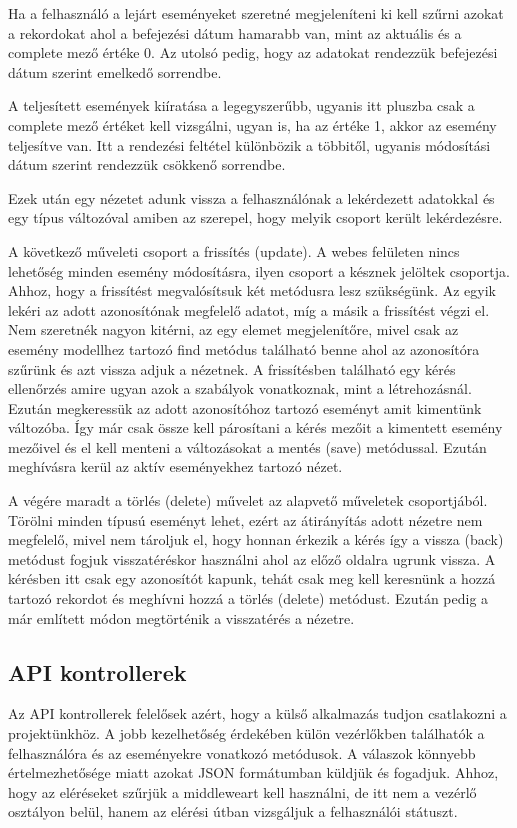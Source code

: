 \documentclass[
]{thesis-ekf}
\theoremstyle{definition}
\theoremstyle{remark}
\begin{document}
	Ha a felhasználó a lejárt eseményeket szeretné megjeleníteni ki kell szűrni azokat a rekordokat ahol a befejezési dátum hamarabb van, mint az aktuális és a complete mező értéke 0. Az utolsó pedig, hogy az adatokat rendezzük befejezési dátum szerint emelkedő sorrendbe.
	
	A teljesített események kiíratása a legegyszerűbb, ugyanis itt pluszba csak a complete mező értéket kell vizsgálni, ugyan is, ha az értéke 1, akkor az esemény teljesítve van. Itt a rendezési feltétel különbözik a többitől, ugyanis módosítási dátum szerint rendezzük csökkenő sorrendbe.
	
	Ezek után egy nézetet adunk vissza a felhasználónak a lekérdezett adatokkal és egy típus változóval amiben az szerepel, hogy melyik csoport került lekérdezésre.
	
	A következő műveleti csoport a frissítés (update). A webes felületen nincs lehetőség minden esemény módosításra, ilyen csoport a késznek jelöltek csoportja. Ahhoz, hogy a frissítést megvalósítsuk két metódusra lesz szükségünk. Az egyik lekéri az adott azonosítónak megfelelő adatot, míg a másik a frissítést végzi el. Nem szeretnék nagyon kitérni, az egy elemet megjelenítőre, mivel csak az esemény modellhez tartozó find metódus található benne ahol az azonosítóra szűrünk és azt vissza adjuk a nézetnek. A frissítésben található egy kérés ellenőrzés amire ugyan azok a szabályok vonatkoznak, mint a létrehozásnál. Ezután megkeressük az adott azonosítóhoz tartozó eseményt amit kimentünk változóba. Így már csak össze kell párosítani a kérés mezőit a kimentett esemény mezőivel és el kell menteni a változásokat a mentés (save) metódussal. Ezután meghívásra kerül az aktív eseményekhez tartozó nézet. 
	
	A végére maradt a törlés (delete) művelet az alapvető műveletek csoportjából. Törölni minden típusú eseményt lehet, ezért az átirányítás adott nézetre nem megfelelő, mivel nem tároljuk el, hogy honnan érkezik a kérés így a vissza (back) metódust fogjuk visszatéréskor használni ahol az előző oldalra ugrunk vissza. A kérésben itt csak egy azonosítót kapunk, tehát csak meg kell keresnünk a hozzá tartozó rekordot és meghívni hozzá a törlés (delete) metódust. Ezután pedig a már említett módon megtörténik a visszatérés a nézetre. 
	
	\subsection{API kontrollerek}
	Az API kontrollerek felelősek azért, hogy a külső alkalmazás tudjon csatlakozni a projektünkhöz. A jobb kezelhetőség érdekében külön vezérlőkben találhatók a felhasználóra és az eseményekre vonatkozó metódusok. A válaszok könnyebb értelmezhetősége miatt azokat JSON formátumban küldjük és fogadjuk. Ahhoz, hogy az eléréseket szűrjük a middleweart kell használni, de itt nem a vezérlő osztályon belül, hanem az elérési útban vizsgáljuk a felhasználói státuszt.
	
\end{document}
